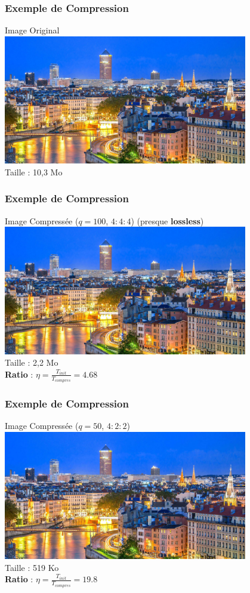 \documentclass[aspectratio=43]{beamer}
\begin{document}
\begin{frame}
    \frametitle{Exemple de Compression}

    \centering
    Image Original \\
    \includegraphics[width = 0.8\textwidth]{img/villeLyon.jpg} \\
    Taille : 10,3 Mo
\end{frame}

\begin{frame}
    \frametitle{Exemple de Compression}

    \centering
    Image Compressée ($q = 100$, $4:4:4$) (presque \textbf{lossless}) \\
    \includegraphics[width = 0.8\textwidth]{img/villeLyon.jpg} \\
    Taille : 2,2 Mo \\
    \textbf{Ratio} : $\eta = \frac{T_{init}}{T_{compres}} = 4.68 $

\end{frame}

\begin{frame}
    \frametitle{Exemple de Compression}

    \centering
    Image Compressée ($q = 50$, $4:2:2$) \\
    \includegraphics[width = 0.8\textwidth]{img/villeLyonMid.jpg} \\
    Taille : 519 Ko \\
    \textbf{Ratio} : $\eta = \frac{T_{init}}{T_{compres}} = 19.8$
    
\end{frame}
\end{document}
